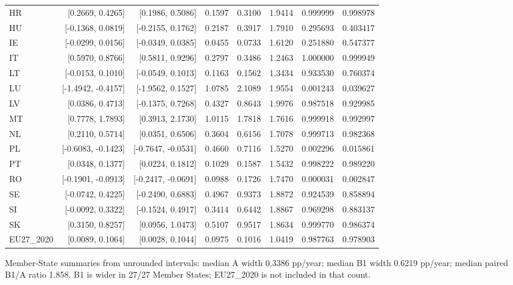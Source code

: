 \begin{longtable}{lrrrrrrr}
HR & [0.2669, 0.4265] & [0.1986, 0.5086] & 0.1597 & 0.3100 & 1.9414 & 0.999999 & 0.998978 \\
HU & [-0.1368, 0.0819] & [-0.2155, 0.1762] & 0.2187 & 0.3917 & 1.7910 & 0.295693 & 0.403417 \\
IE & [-0.0299, 0.0156] & [-0.0349, 0.0385] & 0.0455 & 0.0733 & 1.6120 & 0.251880 & 0.547377 \\
IT & [0.5970, 0.8766] & [0.5811, 0.9296] & 0.2797 & 0.3486 & 1.2463 & 1.000000 & 0.999949 \\
LT & [-0.0153, 0.1010] & [-0.0549, 0.1013] & 0.1163 & 0.1562 & 1.3434 & 0.933530 & 0.760374 \\
LU & [-1.4942, -0.4157] & [-1.9562, 0.1527] & 1.0785 & 2.1089 & 1.9554 & 0.001243 & 0.039627 \\
LV & [0.0386, 0.4713] & [-0.1375, 0.7268] & 0.4327 & 0.8643 & 1.9976 & 0.987518 & 0.929985 \\
MT & [0.7778, 1.7893] & [0.3913, 2.1730] & 1.0115 & 1.7818 & 1.7616 & 0.999918 & 0.992997 \\
NL & [0.2110, 0.5714] & [0.0351, 0.6506] & 0.3604 & 0.6156 & 1.7078 & 0.999713 & 0.982368 \\
PL & [-0.6083, -0.1423] & [-0.7647, -0.0531] & 0.4660 & 0.7116 & 1.5270 & 0.002296 & 0.015861 \\
PT & [0.0348, 0.1377] & [0.0224, 0.1812] & 0.1029 & 0.1587 & 1.5432 & 0.998222 & 0.989220 \\
RO & [-0.1901, -0.0913] & [-0.2417, -0.0691] & 0.0988 & 0.1726 & 1.7470 & 0.000031 & 0.002847 \\
SE & [-0.0742, 0.4225] & [-0.2490, 0.6883] & 0.4967 & 0.9373 & 1.8872 & 0.924539 & 0.858894 \\
SI & [-0.0092, 0.3322] & [-0.1524, 0.4917] & 0.3414 & 0.6442 & 1.8867 & 0.969298 & 0.883137 \\
SK & [0.3150, 0.8257] & [0.0956, 1.0473] & 0.5107 & 0.9517 & 1.8634 & 0.999770 & 0.986374 \\
EU27\_2020 & [0.0089, 0.1064] & [0.0028, 0.1044] & 0.0975 & 0.1016 & 1.0419 & 0.987763 & 0.978903 \\
\end{longtable}
\noindent Member-State summaries from unrounded intervals: median A width 0.3386 pp/year; median B1 width 0.6219 pp/year; median paired B1/A ratio 1.858. B1 is wider in 27/27 Member States; EU27\_2020 is not included in that count.
\endgroup
